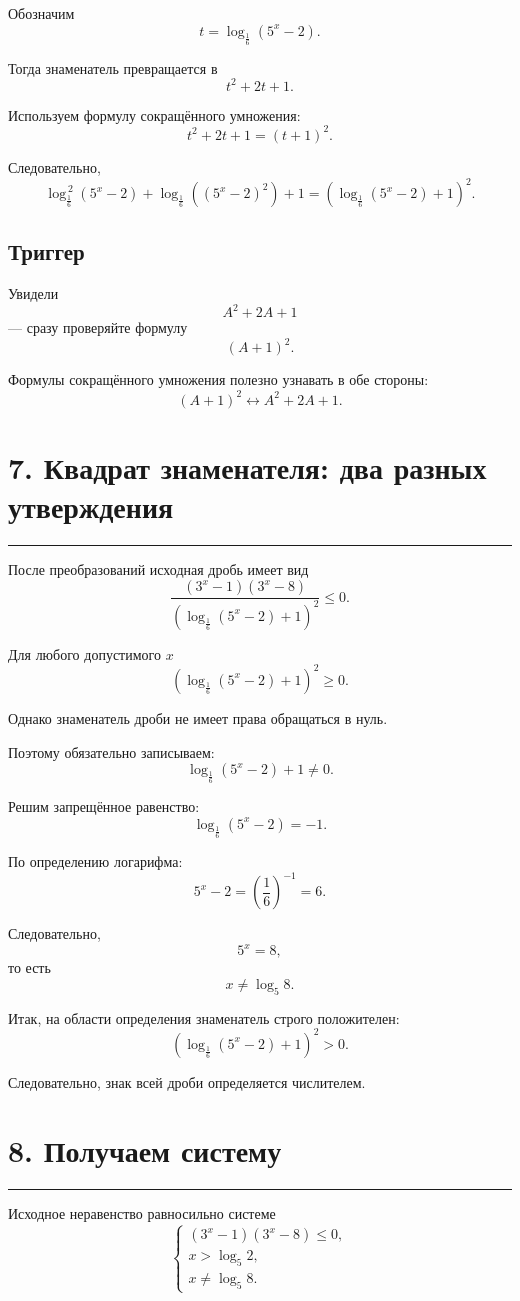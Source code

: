 \documentclass[a4paper,12pt]{article}
\newcommand{\topicline}{%
  \par\noindent
  {\color{accent!55}\rule{\linewidth}{0.6pt}}
  \par
}
\begin{document}
Обозначим
\[
t=\log_{\frac16}(5^x-2).
\]

Тогда знаменатель превращается в
\[
t^2+2t+1.
\]

Используем формулу сокращённого умножения:
\[
t^2+2t+1=(t+1)^2.
\]

Следовательно,
\[
\boxed{
\log_{\frac16}^{\,2}(5^x-2)
+
\log_{\frac16}\!\left((5^x-2)^2\right)
+1
=
\left(
\log_{\frac16}(5^x-2)+1
\right)^2
}.
\]

\subsection*{\color{accent}Триггер}

Увидели
\[
A^2+2A+1
\]
--- сразу проверяйте формулу
\[
(A+1)^2.
\]

Формулы сокращённого умножения полезно узнавать в обе стороны:
\[
(A+1)^2
\longleftrightarrow
A^2+2A+1.
\]

\section*{\color{darkaccent}7. Квадрат знаменателя: два разных утверждения}
\topicline

После преобразований исходная дробь имеет вид
\[
\frac{
(3^x-1)(3^x-8)
}{
\left(
\log_{\frac16}(5^x-2)+1
\right)^2
}
\le0.
\]

Для любого допустимого \(x\)
\[
\left(
\log_{\frac16}(5^x-2)+1
\right)^2\ge0.
\]

Однако знаменатель дроби не имеет права обращаться в нуль.

Поэтому обязательно записываем:
\[
\log_{\frac16}(5^x-2)+1\ne0.
\]

Решим запрещённое равенство:
\[
\log_{\frac16}(5^x-2)=-1.
\]

По определению логарифма:
\[
5^x-2=
\left(\frac16\right)^{-1}=6.
\]

Следовательно,
\[
5^x=8,
\]
то есть
\[
\boxed{x\ne\log_5 8}.
\]

Итак, на области определения знаменатель строго положителен:
\[
\left(
\log_{\frac16}(5^x-2)+1
\right)^2>0.
\]

Следовательно, знак всей дроби определяется числителем.

\section*{\color{darkaccent}8. Получаем систему}
\topicline

Исходное неравенство равносильно системе
\[
\begin{cases}
(3^x-1)(3^x-8)\le0,\\[1mm]
x>\log_5 2,\\[1mm]
x\ne\log_5 8.
\end{cases}
\]
\end{document}
